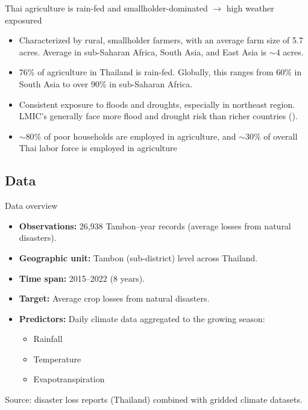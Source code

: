 \documentclass{beamer}
\begin{document}
    \begin{frame}{Thai agriculture is rain-fed and smallholder-dominated $\rightarrow$ high weather exposured}
        \begin{itemize}
            \setlength \itemsep{1.5em}
            \item Characterized by rural, smallholder farmers, with an average farm size of 5.7 acres. Average in sub-Saharan Africa, South Asia, and East Asia is $\sim 4$ acres. 
            \item $76\%$ of agriculture in Thailand is rain-fed. Globally, this ranges from $60\%$ in South Asia to over $90\%$ in sub-Saharan Africa. 
            \item Consistent exposure to floods and droughts, especially in northeast region. LMIC's generally face more flood and drought risk than richer countries (\cite{winsemius2018disaster}). 
            \item $\sim 80\%$ of poor households are employed in agriculture, and $\sim 30\%$ of overall Thai labor force is employed in agriculture
        \end{itemize}
    \end{frame}

\subsection{Data}
\begin{frame}{Data overview}
  \small
  \begin{itemize}\itemsep4pt
    \item \textbf{Observations:} 26,938 Tambon--year records (average losses from natural disasters).
    \item \textbf{Geographic unit:} Tambon (sub-district) level across Thailand.
    \item \textbf{Time span:} 2015--2022 (8 years).
    \item \textbf{Target:} Average crop losses from natural disasters.
    \item \textbf{Predictors:} Daily climate data aggregated to the growing season:
      \begin{itemize}\itemsep2pt
        \item Rainfall
        \item Temperature
        \item Evapotranspiration
      \end{itemize}
  \end{itemize}
  
  \medskip
  {\scriptsize Source: disaster loss reports (Thailand) combined with gridded climate datasets.}
  \end{frame}
\end{document}
